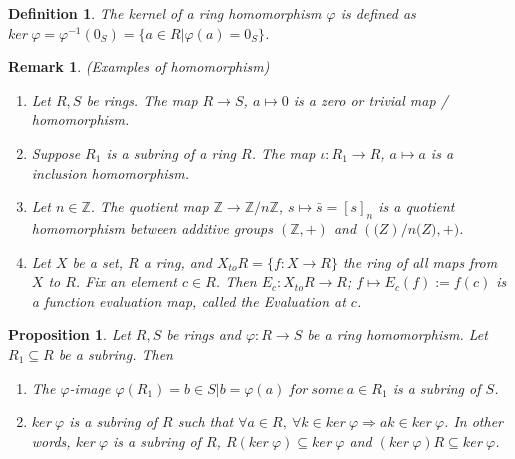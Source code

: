 \documentclass[a4paper,sfsidenotes,openany]{tufte-book}
\theoremstyle{theorem}
\newtheorem{proposition}[theorem]{Proposition}
\newtheorem{definition}[theorem]{Definition}
\newtheorem{remark}[theorem]{Remark}
\begin{document}
\begin{fullwidth}
\begin{definition}
The \textit{{\color{blue} kernel}} of a ring homomorphism $\varphi$ is defined as $ker \ \varphi = \varphi^{-1}(0_S) = \{a \in R | \varphi(a) = 0_S\} $.
\end{definition}
\>

\begin{remark}
\textit{{\color{blue} (Examples of homomorphism)}}\\
\begin{enumerate}[label=(\roman*),leftmargin=0pt, itemindent=4em, align=left]
\item Let $R, S$ be rings. The map $R \rightarrow S$, $a \mapsto 0$ is a \textit{{\color{blue} zero or trivial map / homomorphism}}.
\item Suppose $R_1$ is a subring of a ring $R$. The map $\iota: R_1 \rightarrow R$, $a \mapsto a$ is a \textit{{\color{blue} inclusion homomorphism}}.\\
\item Let $n \in \mathbb{Z}$. The quotient map $\mathbb{Z} \rightarrow \mathbb{Z}/n\mathbb{Z}$, $s \mapsto \bar{s} = [s]_n $ is a \textit{{\color{blue} quotient homomorphism}} between additive groups $(\mathbb{Z}, +)$ and $(\mathbb(Z)/n\mathbb(Z), +)$.
\item Let $X$ be a set, $R$ a ring, and $X_{to}R = \{f: X \rightarrow R\}$ the ring of all maps from $X$ to $R$. Fix an element $c\in R$. Then $E_c: X_{to}R \rightarrow R$; $f \mapsto E_c(f) := f(c)$ is a \textit{{\color{blue} function evaluation map}}, called the \textit{{\color{blue} Evaluation at $c$}}.
\end{enumerate}
\end{remark}
\>

\begin{proposition}
Let $R, S$ be rings and $\varphi: R \rightarrow S$ be a ring homomorphism. Let $R_1 \subseteq R$ be a subring. Then
\begin{enumerate}[label=(\roman*),leftmargin=0pt, itemindent=4em, align=left]
\item The $\varphi$-image $\varphi(R_1) = {b \in S | b = \varphi(a) \ for \ some \ a \in R_1}$ is a subring of $S$.
\item $ker \ \varphi$ is a subring of $R$ such that $\forall a \in R, \ \forall k \in ker \ \varphi \Rightarrow ak \in ker \ \varphi$. In other words, $ker \ \varphi$ is a subring of $R$, $R(ker \ \varphi) \subseteq ker \ \varphi$ and $(ker \ \varphi)R \subseteq ker \ \varphi$.
\end{enumerate}
\end{proposition}
\>


\end{fullwidth}
\end{document}
